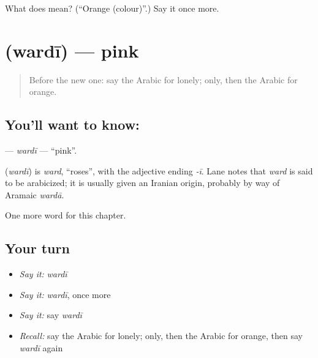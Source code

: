 \begin{tcolorbox}[breakable,colback=teal!4,colframe=teal!35!black,title={Before you move on}]
What does  mean? (\textquotedblleft{}Orange (colour)\textquotedblright{}.) Say it once more.
\end{tcolorbox}
\section[\texorpdfstring{\ar{وردي} (wardī)}{وردي (wardī)}]{ (wardī) — pink}

\label{lesson:AR-C271-wardi}



\begin{quote}
Before the new one: say the Arabic for lonely; only, then the Arabic for orange.
\end{quote}

\subsection*{You'll want to know: }
\textbf{} — \emph{wardī} — \textquotedblleft{}pink\textquotedblright{}.

\begin{cousinweb}
\textbf{} (\emph{wardī}) is \emph{ward}, \textquotedblleft{}roses\textquotedblright{}, with the adjective ending \emph{-ī}. Lane notes that \emph{ward} is said to be arabicized; it is usually given an Iranian origin, probably by way of Aramaic \emph{wardā}.
\end{cousinweb}

\begin{grammarlens}[title={What you've built}]
One more word for this chapter.
\end{grammarlens}

\subsection*{Your turn}
\begin{itemize}
\raggedright
  \item \emph{Say it:} \emph{wardī}
  \item \emph{Say it:} \emph{wardī}, once more
  \item \emph{Say it:} say \emph{wardī}
  \item \emph{Recall:} say the Arabic for lonely; only, then the Arabic for orange, then say \emph{wardī} again
\end{itemize}

